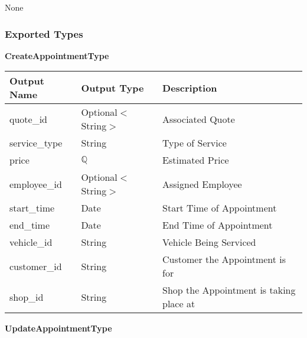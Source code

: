 \documentclass[12pt, titlepage]{article}
\begin{document}
None

\subsubsection{Exported Types}

\textbf{CreateAppointmentType}

\begin{table}[H]
	\begin{tabular}{|l|l|l|}
		\hline
		\textbf{Output Name} & \textbf{Output Type} & \textbf{Description}                    \\
		\hline
		quote\_id            & Optional$<$String$>$ & Associated Quote                        \\
		\hline
		service\_type        & String               & Type of Service                         \\
		\hline
		price                & $\mathbb{Q}$         & Estimated Price                         \\
		\hline
		employee\_id         & Optional$<$String$>$ & Assigned Employee                       \\
		\hline
		start\_time          & Date                 & Start Time of Appointment               \\
		\hline
		end\_time            & Date                 & End Time of Appointment                 \\
		\hline
		vehicle\_id          & String               & Vehicle Being Serviced                  \\
		\hline
		customer\_id         & String               & Customer the Appointment is for         \\
		\hline
		shop\_id             & String               & Shop the Appointment is taking place at \\
		\hline
	\end{tabular}
\end{table}

\textbf{UpdateAppointmentType}
\end{document}
